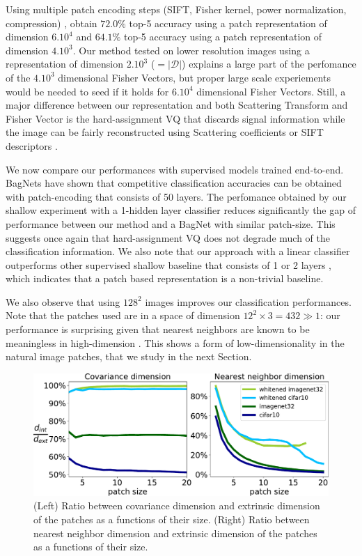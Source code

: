 \documentclass{article}
\begin{document}
Using multiple patch encoding steps (SIFT, Fisher kernel, power normalization, compression) , \cite{sanchez2013image} obtain $72.0\%$ top-5 accuracy using a patch representation of dimension $6.10^4$ and $64.1\%$ top-5 accuracy using a patch representation of dimension $4.10^3$.
Our method tested on lower resolution images using a representation of dimension $2.10^3$ ($=|\mathcal{D}|$) explains a large part of the perfomance of the $4.10^3$ dimensional Fisher Vectors, but proper large scale experiements would be needed to seed if it holds for $6.10^4$ dimensional Fisher Vectors.
Still, a major difference between our representation and both Scattering Transform and Fisher Vector is the hard-assignment VQ that discards signal information while the image can be fairly reconstructed using Scattering coefficients \citep{oyallon2017scaling} or SIFT descriptors \citep{weinzaepfel2011reconstructing}.


We now compare our performances with supervised models trained end-to-end.
BagNets \citep{brendel2019approximating} have shown that  competitive classification accuracies can be obtained with patch-encoding that consists of 50 layers.
The perfomance obtained by our shallow experiment with a 1-hidden layer classifier reduces significantly the gap of performance between our method and a BagNet with similar patch-size.
This suggests once again that hard-assignment VQ does not degrade much of the classification information.
We also note that our approach with a linear classifier outperforms other supervised shallow baseline that consists of 1 or 2 layers \citep{belilovsky2018greedy}, which indicates that a patch based representation is a non-trivial baseline.

We also observe that using $128^2$ images improves our classification performances.
Note that the patches used are in a space of dimension $12^2 \times 3 = 432 \gg 1$:  our performance is surprising given that  nearest neighbors are known to be meaningless in high-dimension \citep{beyer1999nearest}.
This shows a form of low-dimensionality in the natural image patches, that we study in the next Section.




\begin{figure}\center
	\includegraphics[width=.9\linewidth]{figures/intrinsic_dims}
	\caption{(Left) Ratio between covariance dimension and extrinsic dimension of the patches as a functions of their size. (Right) Ratio between nearest neighbor dimension and extrinsic dimension of the patches as a functions of their size.}
	\label{fig:intrinsic_dim}
\end{figure}
\end{document}
